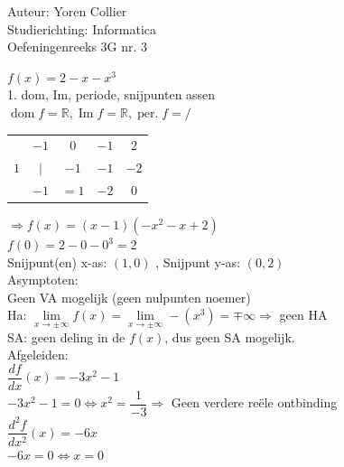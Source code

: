 \documentclass[a4paper]{article}
\newcommand{\asa}{\Leftrightarrow} %
\newcommand{\adR}{\Rightarrow} %
\newcommand{\Lh}{\left(} %
\newcommand{\Rh}{\right)}
\newcommand{\pnR}{\rightarrow} %
\newcommand{\limiet}{\lim\limits_}
\begin{document}
\noindent \large Auteur: Yoren Collier \\
\noindent \large Studierichting: Informatica\\
\noindent \large Oefeningenreeks 3G nr. 3\\

\medskip

\normalsize

$f(x) = 2 -x -x^3$\\

1. dom, Im, periode, snijpunten assen\\

$\operatorname{dom} f = \mathbb{R} , \operatorname{Im} f = \mathbb{R}, \operatorname{per.} f = / $\\
\begin{tabular}{c|cccc}
     &  $-1$  &  $0$   &   $-1$   &  $2$   \\
  $1$&  $|$   &  $-1$  &   $-1$   &  $-2$  \\
     &  $-1$  &  $=1$  &   $-2$   &  $0$  
\end{tabular}

$\adR f(x) = \Lh x-1 \Rh \Lh -x^2 -x +2\Rh$\\

$f(0) = 2 -0 -0^3 = 2$\\

Snijpunt(en) x-as: $\Lh 1, 0 \Rh$ , Snijpunt y-as: $\Lh 0, 2 \Rh$\\

Asymptoten:\\

Geen VA mogelijk (geen nulpunten noemer)\\

Ha: $\limiet{x \pnR \pm\infty} f(x) = \limiet{x \pnR \pm\infty} -\Lh x^3 \Rh = \mp\infty \adR$ geen HA\\

SA: geen deling in de $f(x)$, dus geen SA mogelijk.\\

Afgeleiden:\\

$\dfrac{df}{dx}(x) = -3x^{2} - 1$\\

$-3x^2 -1 = 0 \asa x^2 = \dfrac{1}{-3} \adR $ Geen verdere reële ontbinding\\

$\dfrac{d^2f}{dx^2}(x) = -6x$\\

$-6x = 0 \asa x = 0 $\\
\end{document}
